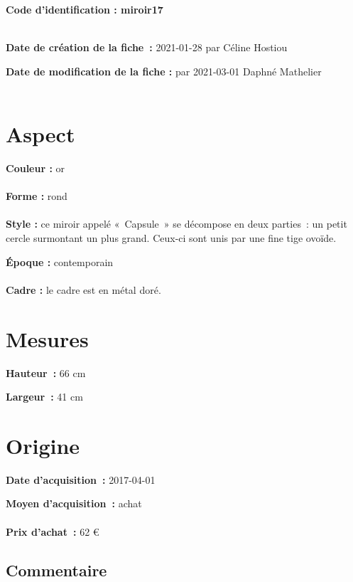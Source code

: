  
    
    
    {\bf \huge Code d’identification : miroir17}
    \\ \\ \hr
    \begin{center}
    \end{center}
    
    {\bf \large Date de création de la fiche :} 2021-01-28
    {par Céline Hostiou}
  
    {\bf \large Date de modification de la fiche :} 
    {par 2021-03-01}
    Daphné Mathelier \\ \\ \hr
    \section* {Aspect}
   {\bf \large Couleur :} or
    \\ \\ {\bf \large Forme :}  rond
    \\ \\ {\bf \large Style :}  ce miroir appelé « Capsule » se décompose en deux parties : un petit cercle
            surmontant un plus grand. Ceux-ci sont unis par une fine tige ovoïde.
        
        {\bf \large Époque :} contemporain
    \\ \\ {\bf \large Cadre :} le cadre est en métal doré.
        
    \section* {Mesures}
      
  {\bf \large Hauteur :} 66 cm
   
   {\bf \large Largeur :} 41 cm
     
    \section* {Origine}
    {\bf \large Date d’acquisition :} 2017-04-01

    {\bf \large Moyen d’acquisition :} achat
          \\ \\{\bf \large Prix d’achat :} 62 €
        
      \subsection* {Commentaire}
       

